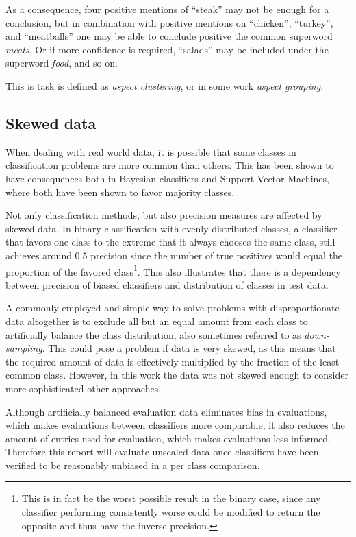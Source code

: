 \documentclass[a4paper,11pt]{kth-mag}
\begin{document}
As a consequence, four positive mentions of ``steak'' may not be enough for a conclusion, but in combination with positive mentions on ``chicken'', ``turkey'',  and ``meatballs'' one may be able to conclude positive the common \gls{superword} \emph{meats}. Or if more confidence is required, ``salads'' may be included under the \gls{superword} \emph{food}, and so on.

This is task is defined as \emph{aspect clustering}, or in some work \emph{aspect grouping}.


\subsection{Skewed data}
\label{subsec:bias}
When dealing with real world data, it is possible that some classes in classification problems are more
common than others. This has been shown to have consequences both in Bayesian classifiers\cite{rennie2003bias}
and Support Vector Machines\cite{svm_bias}, where both have been shown to favor majority
classes\cite{rennie2003bias, svm_bias}.

Not only classification methods, but also precision measures are affected by skewed data. In binary
classification with evenly distributed classes, a classifier that favors one class to the extreme that it
always chooses the same class, still achieves around 0.5 precision since the number of true positives
would equal the proportion of the favored class\footnote{This is in fact be the worst possible result
in the binary case, since any classifier performing consistently worse could be modified to return the
opposite and thus have the inverse precision.}. This also illustrates that there is a dependency between
precision of biased classifiers and distribution of classes in test data.

A commonly employed and simple way to solve problems with disproportionate data altogether is to exclude all but an equal amount from each class to artificially balance the class distribution, also sometimes referred to as \emph{down-sampling}\cite{provost2000machine}. This could pose a problem if data is very skewed, as this means that the required amount of data is effectively multiplied by the fraction of the least common class. However, in this work the data was not skewed enough to consider more sophisticated other approaches.

Although artificially balanced evaluation data eliminates bias in evaluations, which makes evaluations between classifiers more comparable, it also reduces the amount of entries used for evaluation, which makes evaluations less informed. Therefore this report will evaluate unscaled data once classifiers have been verified to be reasonably unbiased in a per class comparison.
\end{document}
